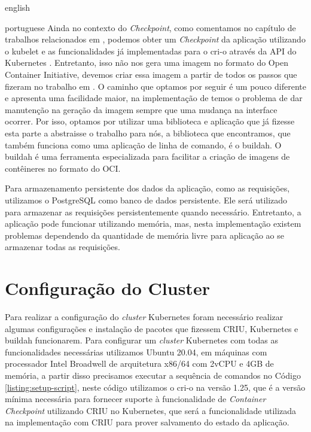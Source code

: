 \begin{otherlanguage*}{english}
\begin{otherlanguage*}{portuguese}
Ainda no contexto do \textit{Checkpoint}, como comentamos no capítulo de trabalhos
relacionados em \cite{schmidttransparent}, podemos obter um \textit{Checkpoint} da
aplicação utilizando o kubelet e as funcionalidades já implementadas para o cri-o
através da API do Kubernetes \cite{kubernetes:container-checkpoint}. Entretanto,
isso não nos gera uma imagem no formato do Open Container Initiative, devemos criar
essa imagem a partir de todos os passos que fizeram no trabalho em
\cite{schmidttransparent}. O caminho que optamos por seguir é um pouco diferente e
apresenta uma facilidade maior, na implementação de \cite{schmidttransparent} temos
o problema de dar manutenção na geração da imagem sempre que uma mudança na interface
ocorrer. Por isso, optamos por utilizar uma biblioteca e aplicação que já fizesse esta
parte a abstraisse o trabalho para nós, a biblioteca que encontramos, que também
funciona como uma aplicação de linha de comando, é o buildah\cite{buildah}. O buildah é
uma ferramenta especializada para facilitar a criação de imagens de contêineres no formato
do OCI.

Para armazenamento persistente dos dados da aplicação, como as requisições, utilizamos
o PostgreSQL \cite{postgresql} como banco de dados persistente. Ele será utilizado para
armazenar as requisições persistentemente quando necessário. Entretanto, a aplicação
pode funcionar utilizando memória, mas, nesta implementação existem problemas dependendo
da quantidade de memória livre para aplicação ao se armazenar todas as requisições.

\section{Configuração do Cluster}

Para realizar a configuração do \textit{cluster} Kubernetes foram necessário realizar
algumas configurações e instalação de pacotes que fizessem CRIU, Kubernetes e buildah
funcionarem. Para configurar um \textit{cluster} Kubernetes com todas as funcionalidades
necessárias utilizamos Ubuntu 20.04, em máquinas com processador Intel Broadwell de
arquitetura x86/64 com 2vCPU e 4GB de memória, a partir disso precisamos executar a
sequência de comandos no Código \ref{listing:setup-script}, neste código utilizamos
o cri-o na versão 1.25, que é a versão mínima necessária para fornecer suporte à
funcionalidade de \textit{Container Checkpoint} utilizando CRIU no Kubernetes, que será
a funcionalidade utilizada na implementação com CRIU para prover salvamento do estado
da aplicação.


\end{otherlanguage*}
\end{otherlanguage*}
